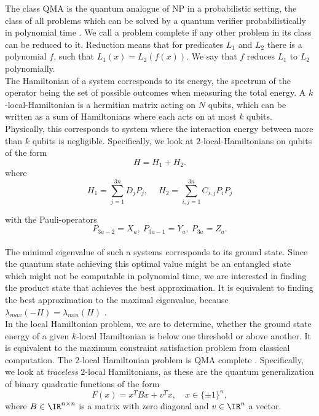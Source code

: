 The class QMA is the quantum analogue of NP in a probabilistic setting, the class of all problems which can be solved by a quantum verifier probabilistically in polynomial time \cite{kempe06}.
We call a problem complete if any other problem in its class can be reduced to it.
Reduction means that for predicates $L_1$ and $L_2$ there is a polynomial $f$, such that $L_1(x)=L_2(f(x))$.
We say that $f$ reduces  $L_1$ to $L_2$ polynomially.\\
The Hamiltonian of a system corresponds to its energy, the spectrum of the operator being the set of possible outcomes when measuring the total energy.
A $k$-local-Hamiltonian is a hermitian matrix acting on $N$ qubits, which can be written as a sum of Hamiltonians where each acts on at most $k$ qubits.
Physically, this corresponds to system where the interaction energy between more than $k$ qubits is negligible.
Specifically, we look at $2$-local-Hamiltonians on qubits of the form \[
H = H_1+H_2
.\]
where
\begin{equation}\label{ham}
	H_1 = \sum_{j=1}^{3n} D_jP_j,\quad ~ H_2  = \sum_{i,j=1}^{3n} C_{i,j}P_iP_j
\end{equation}

with the Pauli-operators \[
	P_{3a-2}=X_a, ~ P_{3a-1}=Y_a, ~ P_{3a}=Z_a
.\]\\
The minimal eigenvalue of such a systems corresponds to its ground state.
Since the quantum state achieving this optimal value might be an entangled state which might not be computable in polynomial time, we are interested in finding the product state that achieves the best approximation.
It is equivalent to finding the best approximation to the maximal eigenvalue, because $\lambda_{max}(-H)=\lambda_{min}(H)$ \cite{gharibian19}.\\
In the local Hamiltonian problem, we are to determine, whether the ground state energy of a given $k$-local Hamiltonian is below one threshold or above another.
It is equivalent to the maximum constraint satisfaction problem from classical computation.
The $2$-local Hamiltonian problem is QMA complete \cite{kempe06}.
Specifically, we look at \emph{traceless} $2$-local Hamiltonians, as these are the quantum generalization of binary quadratic functions of the form \[
	F(x) = x^{T}Bx +v^{T}x, \quad x\in \{\pm 1\} ^{n},
\]
where $B\in\IR^{n\times n}$ is a matrix with zero diagonal and $v\in\IR^{n}$ a vector.
